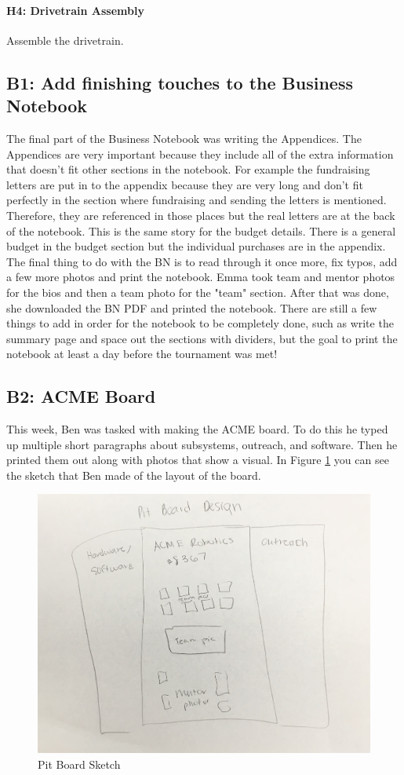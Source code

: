 \documentclass{article}
\begin{document}
\paragraph{H4: Drivetrain Assembly}
 Assemble the drivetrain.
\newpage
\subsection{B1: Add finishing touches to the Business Notebook}

The final part of the Business Notebook was writing the Appendices. The Appendices are very important because they include all of the extra information that doesn't fit other sections in the notebook. For example the fundraising letters are put in to the appendix because they are very long and don't fit perfectly in the section where fundraising and sending the letters is mentioned. Therefore, they are referenced in those places but the real letters are at the back of the notebook. This is the same story for the budget details. There is a general budget in the budget section but the individual purchases are in the appendix. \\
The final thing to do with the BN is to read through it once more, fix typos, add a few more photos and print the notebook. Emma took team and mentor photos for the bios and then a team photo for the "team" section. After that was done, she downloaded the BN PDF and printed the notebook. There are still a few things to add in order for the notebook to be completely done, such as write the summary page and space out the sections with dividers, but the goal to print the notebook at least a day before the tournament was met!

\subsection{B2: ACME Board}

This week, Ben was tasked with making the ACME board. To do this he typed up multiple short paragraphs about subsystems, outreach, and software. Then he printed them out along with photos that show a visual. In Figure \ref{fig:pitboard} you can see the sketch that Ben made of the layout of the board. 

\begin{figure}
    \centering
    \includegraphics[width=.6 \textwidth]{10_11-05/images/pit_board.jpg}
    \caption{Pit Board Sketch}
    \label{fig:pitboard}
\end{figure}
\end{document}
